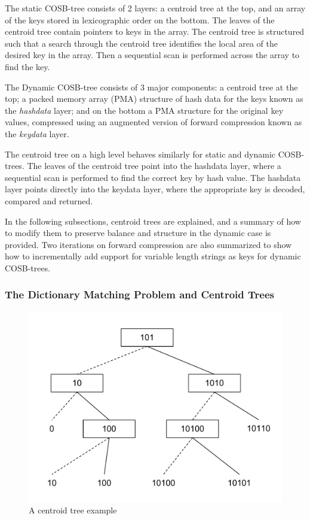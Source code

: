 \documentclass{style}
\begin{document}
The static COSB-tree consists of 2 layers: a centroid tree at the top, and an
array of the keys stored in lexicographic order on the bottom. The leaves of
the centroid tree contain pointers to keys in the array. The centroid tree is
structured such that a search through the centroid tree identifies the local
area of the desired key in the array. Then a sequential scan is performed
across the array to find the key.

The Dynamic COSB-tree consists of 3 major components: a centroid tree at the
top; a packed memory array (PMA) structure of hash data for the keys known as
the \emph{hashdata} layer; and on the bottom a PMA structure for the original
key values, compressed using an augmented version of forward compression known
as the \emph{keydata} layer.

The centroid tree on a high level behaves similarly for static and dynamic
COSB-trees. The leaves of the centroid tree point into the hashdata layer,
where a sequential scan is performed to find the correct key by hash value.
The hashdata layer points directly into the keydata layer, where the
appropriate key is decoded, compared and returned.

In the following subsections, centroid trees are explained, and a summary of
how to modify them to preserve balance and structure in the dynamic case is
provided. Two iterations on forward compression are also summarized to show
how to incrementally add support for variable length strings as keys for
dynamic COSB-trees.

\subsubsection{The Dictionary Matching Problem and Centroid Trees} %
\begin{figure}

\begin{center}
	\includegraphics[width=0.8\columnwidth]{figures/centroidtreeexample.pdf}
\end{center}

\caption{A centroid tree example}
\label{fig:centroid}
\end{figure}
\end{document}
